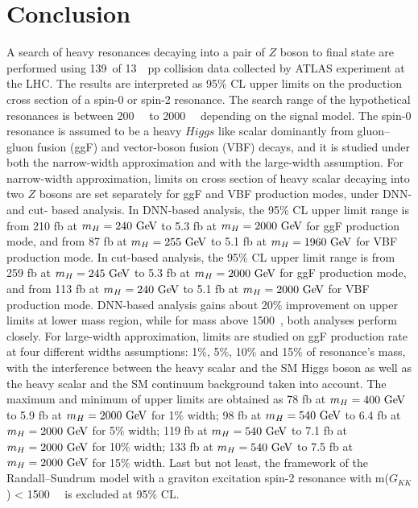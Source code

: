 \section{Conclusion}

A search of heavy resonances decaying into a pair of $Z$ boson to \llll final state are performed using
139~\ifb of 13~\tev~pp collision data collected by ATLAS experiment at the LHC.
The results are interpreted as 95\% CL upper limits on the production cross section of a spin-0 or spin-2 resonance.
The search range of the hypothetical resonances is between 200~\gev~ to 2000~\gev~ depending on the signal model.
The spin-0 resonance is assumed to be a heavy $Higgs$ like scalar dominantly from gluon–gluon fusion (ggF) and vector-boson fusion (VBF) decays, and it is studied under both the narrow-width approximation and with the large-width assumption.
For narrow-width approximation, limits on cross section of heavy scalar decaying into two $Z$ bosons are set separately for ggF and VBF production modes, under DNN- and cut- based analysis.
In DNN-based analysis, the 95\% CL upper limit range is from 210 fb at $m_{H} = 240~\text{Ge\kern -0.1em V}$ to 5.3 fb at $m_{H} = 2000~\text{Ge\kern -0.1em V}$ for ggF production mode, 
and from 87 fb at $m_{H} = 255~\text{Ge\kern -0.1em V}$ to 5.1 fb at $m_{H} = 1960~\text{Ge\kern -0.1em V}$ for VBF production mode.
In cut-based analysis, the 95\% CL upper limit range is from 259 fb at $m_{H} = 245~\text{Ge\kern -0.1em V}$ to 5.3 fb at $m_{H} = 2000~\text{Ge\kern -0.1em V}$ for ggF production mode, 
and from 113 fb at $m_{H} = 240~\text{Ge\kern -0.1em V}$ to 5.1 fb at $m_{H} = 2000~\text{Ge\kern -0.1em V}$ for VBF production mode.
DNN-based analysis gains about 20\% improvement on upper limits at lower mass region, while for mass above 1500~\gev, both analyses perform closely.
For large-width approximation, limits are studied on ggF production rate at four different widths assumptions: 1\%, 5\%, 10\% and 15\% of resonance's mass,
 with the interference between the heavy scalar and the SM Higgs boson as well as the heavy scalar and the SM \ggZZ continuum background taken into account.
The maximum and minimum of upper limits are obtained as 78 fb at $m_{H} = 400~\text{Ge\kern -0.1em V}$ to 5.9 fb at $m_{H} = 2000~\text{Ge\kern -0.1em V}$ for 1\% width;
98 fb at $m_{H} = 540~\text{Ge\kern -0.1em V}$ to 6.4 fb at $m_{H} = 2000~\text{Ge\kern -0.1em V}$ for 5\% width;
119 fb at $m_{H} = 540~\text{Ge\kern -0.1em V}$ to 7.1 fb at $m_{H} = 2000~\text{Ge\kern -0.1em V}$ for 10\% width;
133 fb at $m_{H} = 540~\text{Ge\kern -0.1em V}$ to 7.5 fb at $m_{H} = 2000~\text{Ge\kern -0.1em V}$ for 15\% width.
Last but not least, the framework of the Randall–Sundrum model with a graviton excitation spin-2 resonance with m($G_{KK}$) < 1500~\gev~ is excluded at 95\% CL.
